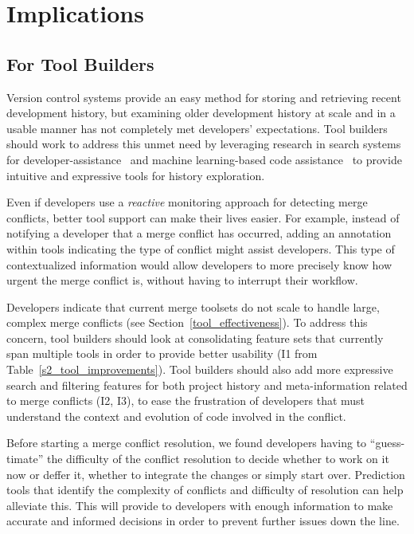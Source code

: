 \section{Implications}\label{implications}

\subsection{For Tool Builders}
Version control systems provide an easy method for storing and retrieving recent development history, but examining older development history at scale and in a usable manner has not completely met developers' expectations.
Tool builders should work to address this unmet need by leveraging research in search systems for developer-assistance~\cite{nabi2016putting} and machine learning-based code assistance~\cite{bradley2011history_exploration} to provide intuitive and expressive tools for history exploration.

Even if developers use a \emph{reactive} monitoring approach for detecting merge conflicts, better tool support can make their lives easier.
For example, instead of notifying a developer that a merge conflict has occurred, adding an annotation within tools indicating the type of conflict might assist developers.
This type of contextualized information would allow developers to more precisely know how urgent the merge conflict is, without having to interrupt their workflow.

Developers indicate that current merge toolsets do not scale to handle large, complex merge conflicts (see Section~\ref{tool_effectiveness}).
To address this concern, tool builders should look at consolidating feature sets that currently span multiple tools in order to provide better usability (I1 from Table~\ref{s2_tool_improvements}).
Tool builders should also add more expressive search and filtering features for both project history and meta-information related to merge conflicts (I2, I3), to ease the frustration of developers that must understand the context and evolution of code involved in the conflict.

Before starting a merge conflict resolution, we found developers having to ``guess-timate'' the difficulty of the conflict resolution to decide whether to work on it now or deffer it, whether to integrate the changes or simply start over. 
Prediction tools that identify the complexity of conflicts and difficulty of resolution can help alleviate this.
This will provide to developers with enough information to make accurate and informed decisions in order to prevent further issues down the line.

